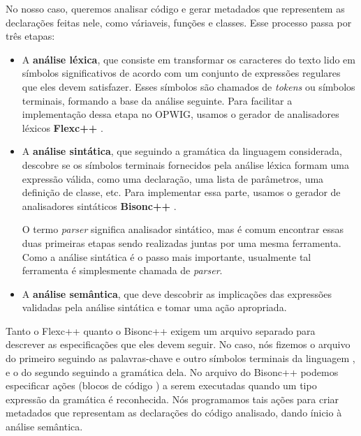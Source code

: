   No nosso caso, queremos analisar código \CXX{} e gerar metadados que representem as declarações feitas
  nele, como váriaveis, funções e classes. Esse processo passa por três etapas:
  \begin{itemize}
    \item A \textbf{análise léxica}, que consiste em transformar os caracteres do texto lido em símbolos 
      significativos de acordo com um conjunto de expressões regulares que eles devem satisfazer.
      Esses símbolos são chamados de \textit{tokens} ou símbolos terminais, formando a base da
      análise seguinte.
      Para facilitar a implementação dessa etapa no OPWIG, usamos o gerador de analisadores léxicos
      \textbf{Flexc++} \cite{flex:00}.
      
    \item A \textbf{análise sintática}, que seguindo a gramática da linguagem considerada, 
      descobre se os símbolos terminais fornecidos pela análise léxica formam uma expressão válida,
      como uma declaração, uma lista de parâmetros, uma definição de classe, etc.
      Para implementar essa parte, usamos o gerador de analisadores sintáticos \textbf{Bisonc++}
      \cite{bison:00}.
      
      O termo \textit{parser} significa analisador sintático, mas é comum encontrar essas duas
      primeiras etapas sendo realizadas juntas por uma mesma ferramenta. Como a análise sintática
      é o passo mais importante, usualmente tal ferramenta é simplesmente chamada de \textit{parser}.
      
    \item A \textbf{análise semântica}, que deve descobrir as implicações das expressões
      validadas pela análise sintática e tomar uma ação apropriada.
  \end{itemize}
  
  Tanto o Flexc++ quanto o Bisonc++ exigem um arquivo separado para descrever as especificações que
  eles devem seguir. No caso, nós fizemos o arquivo do primeiro seguindo as palavras-chave e outro símbolos
  terminais da linguagem \CXX{}, e o do segundo seguindo a gramática dela. No arquivo do Bisonc++ podemos
  especificar ações (blocos de código \CXX{}) a serem executadas quando um tipo expressão da gramática é
  reconhecida. Nós programamos tais ações para criar metadados que representam as declarações do código
  \CXX{} analisado, dando ínicio à análise semântica.
  
